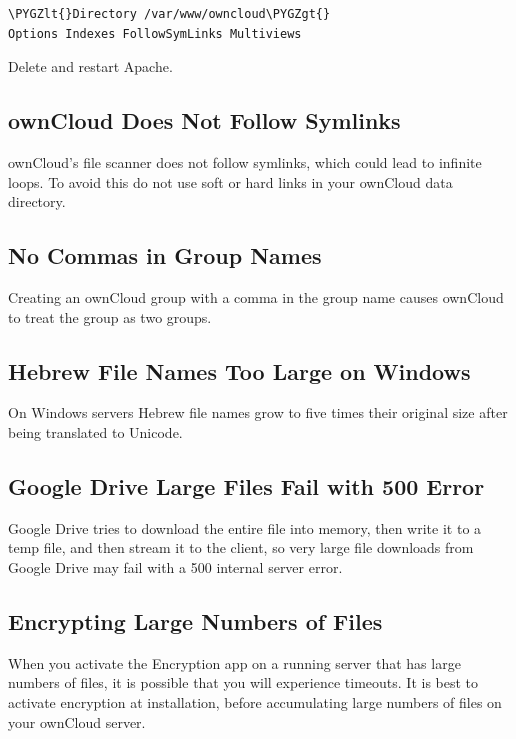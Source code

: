 \documentclass[letterpaper,10pt,english]{sphinxmanual}
\def\PYGZlt{\char`\<}
\def\PYGZgt{\char`\>}
\begin{document}
\begin{Verbatim}[commandchars=\\\{\}]
\PYGZlt{}Directory /var/www/owncloud\PYGZgt{}
Options Indexes FollowSymLinks Multiviews
\end{Verbatim}

Delete  and restart Apache.


\subsection{ownCloud Does Not Follow Symlinks}
\label{release_notes:owncloud-does-not-follow-symlinks}
ownCloud's file scanner does not follow symlinks, which could lead to
infinite loops. To avoid this do not use soft or hard links in your ownCloud
data directory.


\subsection{No Commas in Group Names}
\label{release_notes:no-commas-in-group-names}
Creating an ownCloud group with a comma in the group name causes ownCloud to
treat the group as two groups.


\subsection{Hebrew File Names Too Large on Windows}
\label{release_notes:hebrew-file-names-too-large-on-windows}
On Windows servers Hebrew file names grow to five times their original size
after being translated to Unicode.


\subsection{Google Drive Large Files Fail with 500 Error}
\label{release_notes:google-drive-large-files-fail-with-500-error}
Google Drive tries to download the entire file into memory, then write it to a
temp file, and then stream it to the client, so very large file downloads from
Google Drive may fail with a 500 internal server error.


\subsection{Encrypting Large Numbers of Files}
\label{release_notes:encrypting-large-numbers-of-files}
When you activate the Encryption app on a running server that has large numbers
of files, it is possible that you will experience timeouts. It is best to
activate encryption at installation, before accumulating large numbers of files
on your ownCloud server.
\end{document}
